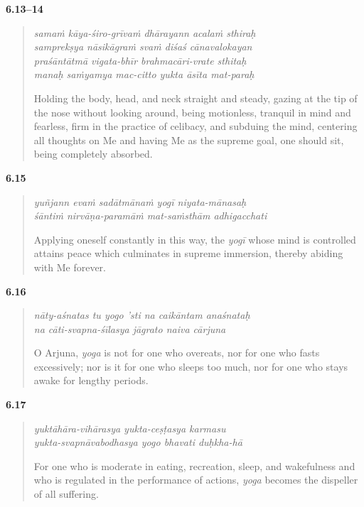 \par\noindent\textbf{6.13–14}\par
\begin{verse}
\textit{samaṁ kāya-śiro-grīvaṁ dhārayann acalaṁ sthiraḥ} \\
\textit{samprekṣya nāsikāgraṁ svaṁ diśaś cānavalokayan} \\
\textit{praśāntātmā vigata-bhīr brahmacāri-vrate sthitaḥ} \\
\textit{manaḥ saṁyamya mac-citto yukta āsīta mat-paraḥ}

\noindent Holding the body, head, and neck straight and steady, gazing at the tip of the nose without looking around, being motionless, tranquil in mind and fearless, firm in the practice of celibacy, and subduing the mind, centering all thoughts on Me and having Me as the supreme goal, one should sit, being completely absorbed.
\end{verse}
\par



\par\noindent\textbf{6.15}\par
\begin{verse}
\textit{yuñjann evaṁ sadātmānaṁ yogī niyata-mānasaḥ} \\
\textit{śāntiṁ nirvāṇa-paramāṁ mat-saṁsthām adhigacchati}

\noindent Applying oneself constantly in this way, the \textit{yogī} whose mind is controlled attains peace which culminates in supreme immersion, thereby abiding with Me forever.
\end{verse}
\par



\par\noindent\textbf{6.16}\par
\begin{verse}
\textit{nāty-aśnatas tu yogo ’sti na caikāntam anaśnataḥ} \\
\textit{na cāti-svapna-śīlasya jāgrato naiva cārjuna}

\noindent O Arjuna, \textit{yoga} is not for one who overeats, nor for one who fasts excessively; nor is it for one who sleeps too much, nor for one who stays awake for lengthy periods.
\end{verse}
\par



\par\noindent\textbf{6.17}\par
\begin{verse}
\textit{yuktāhāra-vihārasya yukta-ceṣṭasya karmasu} \\
\textit{yukta-svapnāvabodhasya yogo bhavati duḥkha-hā}

\noindent For one who is moderate in eating, recreation, sleep, and wakefulness and who is regulated in the performance of actions, \textit{yoga} becomes the dispeller of all suffering.
\end{verse}
\par



